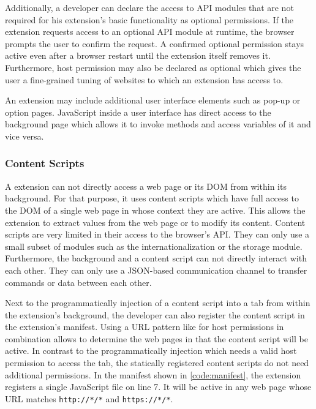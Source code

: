 	Additionally, a developer can declare the access to API modules that are not required for his extension's basic functionality as optional permissions. If the extension requests access to an optional API module at runtime, the browser prompts the user to confirm the request. A confirmed optional permission stays active even after a browser restart until the extension itself removes it. Furthermore, host permission may also be declared as optional which gives the user a fine-grained tuning of websites to which an extension has access to. 
	
	An extension may include additional user interface elements such as pop-up or option pages. JavaScript inside a user interface has direct access to the background page which allows it to invoke methods and access variables of it and vice versa. 
	
\subsubsection{Content Scripts}
	
	A extension can not directly access a web page or its DOM from within its background. For that purpose, it uses content scripts which have full access to the DOM of a single web page in whose context they are active. This allows the extension to extract values from the web page or to modify its content. Content scripts are very limited in their access to the browser's API. They can only use a small subset of modules such as the internationalization or the storage module. Furthermore, the background and a content script can not directly interact with each other. They can only use a JSON-based communication channel to transfer commands or data between each other. 
	
	Next to the programmatically injection of a content script into a tab from within the extension's background, the developer can also register the content script in the extension's manifest. Using a URL pattern like for host permissions in combination allows to determine the web pages in that the content script will be active. In contrast to the programmatically injection which needs a valid host permission to access the tab, the statically registered content scripts do not need additional permissions. In the manifest shown in \autoref{code:manifest}, the extension registers a single JavaScript file on line 7. It will be active in any web page whose URL matches \texttt{http://*/*} and \texttt{https://*/*}.
	
